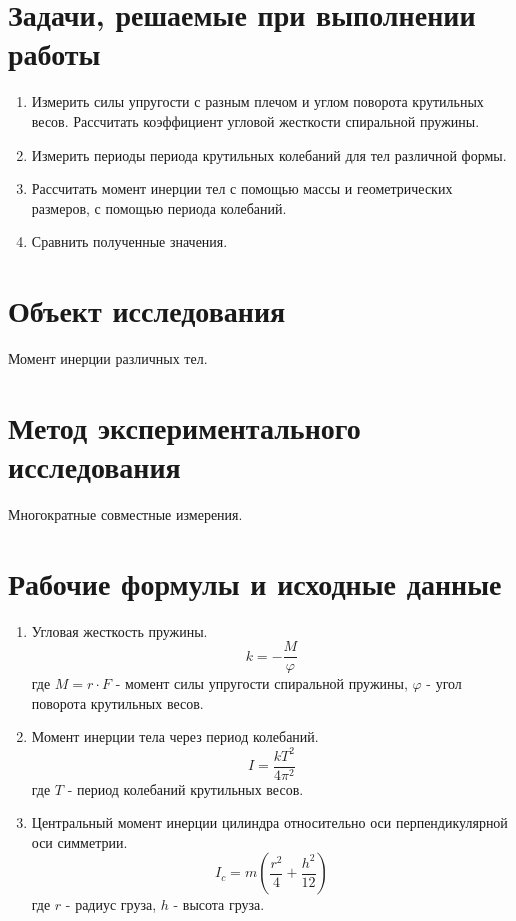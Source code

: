 \documentclass[a4paper,14pt]{article}
\begin{document}
    \section{Задачи, решаемые при выполнении работы}

    \begin{enumerate}
        \item Измерить силы упругости с разным плечом и углом поворота крутильных весов. Рассчитать коэффициент угловой жесткости спиральной пружины.
        \item Измерить периоды периода крутильных колебаний для тел различной формы.
        \item Рассчитать момент инерции тел с помощью массы и геометрических размеров, с помощью периода колебаний.
        \item Сравнить полученные значения.
    \end{enumerate}

    \section{Объект исследования}

    Момент инерции различных тел.

    \section{Метод экспериментального исследования}

    Многократные совместные измерения.

    \section{Рабочие формулы и исходные данные}

    \begin{enumerate}
        \item Угловая жесткость пружины.
        \begin{equation}
            k = -\frac{M}{\varphi}
        \end{equation}
        где \(M = r\cdot F\) -  момент силы упругости спиральной пружины, \(\varphi\) - угол поворота крутильных весов.

        \item Момент инерции тела через период колебаний.
        \begin{equation}
            I = \frac{kT^2}{4\pi^2}
        \end{equation}
        где \(T\) - период колебаний крутильных весов.

        \item Центральный момент инерции цилиндра относительно оси перпендикулярной оси симметрии.
        \begin{equation}
            I_{c} = m\left(\frac{r^2}{4} + \frac{h^2}{12}\right)
        \end{equation}
        где \(r\) - радиус груза, \(h\) - высота груза.

    \end{enumerate}
\end{document}
